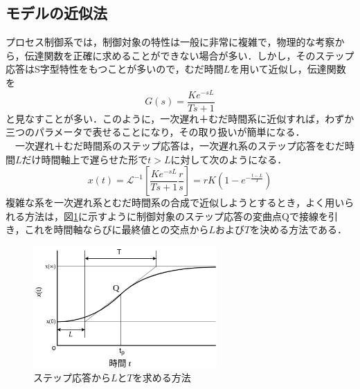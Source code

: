 \documentclass[12pt]{jsarticle}
\begin{document}
\subsection{モデルの近似法}
プロセス制御系では，制御対象の特性は一般に非常に複雑で，物理的な考察から，伝達関数を正確に求めることができない場合が多い．しかし，そのステップ応答はS字型特性をもつことが多いので，むだ時間$L$を用いて近似し，伝達関数を
\begin{equation}
  \label{}
  G(s) = \frac{Ke^{-sL}}{Ts+1}
\end{equation}
と見なすことが多い．このように，一次遅れ＋むだ時間系に近似すれば，わずか三つのパラメータで表せることになり，その取り扱いが簡単になる．\\
　一次遅れ＋むだ時間系のステップ応答は，一次遅れ系のステップ応答をむだ時間$L$だけ時間軸上で遅らせた形で$t>L$に対して次のようになる．
\begin{equation}
  \label{}
  x(t) = \mathcal{L}^{-1}\left[\frac{Ke^{-sL}}{Ts+1}\frac{r}{s}\right] = rK(1 - e^{-\frac{t-L}{T}})
\end{equation}
複雑な系を一次遅れ系とむだ時間系の合成で近似しようとするとき，よく用いられる方法は，図\ref{LT_fromStepResponse}に示すように制御対象のステップ応答の変曲点Qで接線を引き，これを時間軸ならびに最終値との交点から$L$および$T$を決める方法である．
\begin{figure}[tb]
  \begin{center}
    \includegraphics[clip,width=7.0cm]{../img/2-A2.png}
    \caption{ステップ応答から$L$と$T$を求める方法}
    \label{LT_fromStepResponse}
  \end{center}
\end{figure}
\end{document}
